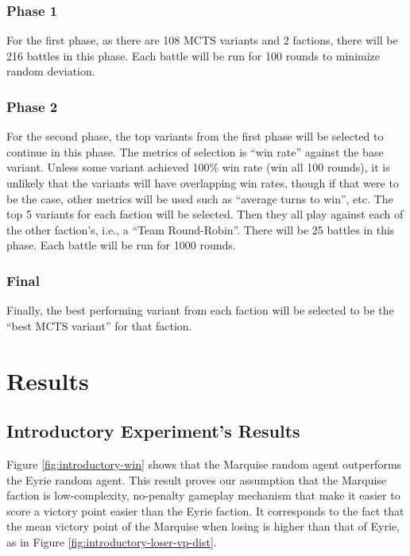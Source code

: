 \subsubsection{Phase 1}
For the first phase, as there are 108 MCTS variants and 2 factions, there will be 216 battles in this phase. Each battle will be run for 100 rounds to minimize random deviation.

\subsubsection{Phase 2}
For the second phase, the top variants from the first phase will be selected to continue in this phase. The metrics of selection is ``win rate'' against the base variant. Unless some variant achieved 100\% win rate (win all 100 rounds), it is unlikely that the variants will have overlapping win rates, though if that were to be the case, other metrics will be used such as ``average turns to win'', etc. The top 5 variants for each faction will be selected. Then they all play against each of the other faction's, i.e., a ``Team Round-Robin''. There will be 25 battles in this phase. Each battle will be run for 1000 rounds.

\subsubsection{Final}
Finally, the best performing variant from each faction will be selected to be the ``best MCTS variant'' for that faction.



\section{Results}

\subsection{Introductory Experiment's Results}

Figure \ref{fig:introductory-win} shows that the Marquise random agent outperforms the Eyrie random agent. This result proves our assumption that the Marquise faction is low-complexity, no-penalty gameplay mechanism that make it easier to score a victory point easier than the Eyrie faction. It corresponds to the fact that the mean victory point of the Marquise when losing is higher than that of Eyrie, as in Figure \ref{fig:introductory-loser-vp-dist}.

